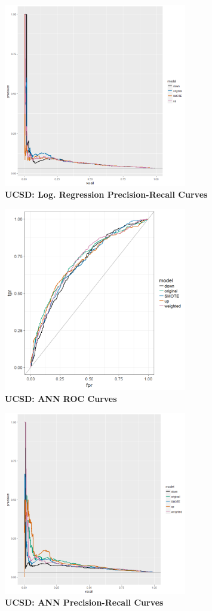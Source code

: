 \documentclass[12pt,]{article}
\begin{document}
\includegraphics[width=0.6\textwidth,height=\textheight]{figures/ucsd/ucsd_glm_PR.png}\\
\textbf{UCSD: Log. Regression Precision-Recall Curves}

\includegraphics[width=0.6\textwidth,height=\textheight]{figures/ucsd/ucsd_nnet_rocs.png}\\
\textbf{UCSD: ANN ROC Curves}

\includegraphics[width=0.6\textwidth,height=\textheight]{figures/ucsd/ucsd_nnet_PR.png}\\
\textbf{UCSD: ANN Precision-Recall Curves}
\end{document}
